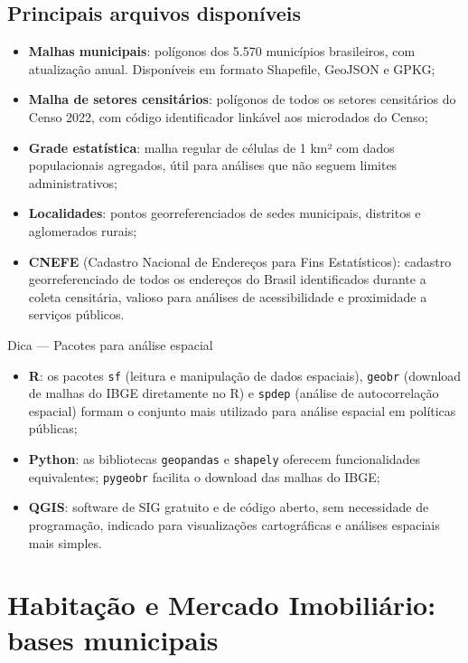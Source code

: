 \subsection{Principais arquivos disponíveis}

\begin{itemize}
  \item \textbf{Malhas municipais}: polígonos dos 5.570 municípios brasileiros, com atualização anual. Disponíveis em formato Shapefile, GeoJSON e GPKG;
  \item \textbf{Malha de setores censitários}: polígonos de todos os setores censitários do Censo 2022, com código identificador linkável aos microdados do Censo;
  \item \textbf{Grade estatística}: malha regular de células de 1 km² com dados populacionais agregados, útil para análises que não seguem limites administrativos;
  \item \textbf{Localidades}: pontos georreferenciados de sedes municipais, distritos e aglomerados rurais;
  \item \textbf{CNEFE} (Cadastro Nacional de Endereços para Fins Estatísticos): cadastro georreferenciado de todos os endereços do Brasil identificados durante a coleta censitária, valioso para análises de acessibilidade e proximidade a serviços públicos.
\end{itemize}

\begin{boxdica}{Dica --- Pacotes para análise espacial}
\begin{itemize}
  \item \textbf{R}: os pacotes \texttt{sf} (leitura e manipulação de dados espaciais), \texttt{geobr} (download de malhas do IBGE diretamente no R) e \texttt{spdep} (análise de autocorrelação espacial) formam o conjunto mais utilizado para análise espacial em políticas públicas;
  \item \textbf{Python}: as bibliotecas \texttt{geopandas} e \texttt{shapely} oferecem funcionalidades equivalentes; \texttt{pygeobr} facilita o download das malhas do IBGE;
  \item \textbf{QGIS}: software de SIG gratuito e de código aberto, sem necessidade de programação, indicado para visualizações cartográficas e análises espaciais mais simples.
\end{itemize}
\end{boxdica}

\section{Habitação e Mercado Imobiliário: bases municipais}
\label{sec:habitacao}

